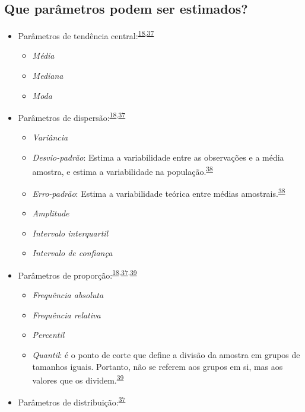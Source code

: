 \documentclass[
]{book}
\begin{document}
\hypertarget{que-paruxe2metros-podem-ser-estimados}{%
\subsection{Que parâmetros podem ser estimados?}\label{que-paruxe2metros-podem-ser-estimados}}

\begin{itemize}
\item
  Parâmetros de tendência central:\textsuperscript{\protect\hyperlink{ref-Ali2016}{18},\protect\hyperlink{ref-kanji2006}{37}}

  \begin{itemize}
  \item
    \emph{Média}
  \item
    \emph{Mediana}
  \item
    \emph{Moda}
  \end{itemize}
\item
  Parâmetros de dispersão:\textsuperscript{\protect\hyperlink{ref-Ali2016}{18},\protect\hyperlink{ref-kanji2006}{37}}

  \begin{itemize}
  \item
    \emph{Variância}
  \item
    \emph{Desvio-padrão}: Estima a variabilidade entre as observações e a média amostra, e estima a variabilidade na população.\textsuperscript{\protect\hyperlink{ref-Curran-Everett2008}{38}}
  \item
    \emph{Erro-padrão}: Estima a variabilidade teórica entre médias amostrais.\textsuperscript{\protect\hyperlink{ref-Curran-Everett2008}{38}}
  \item
    \emph{Amplitude}
  \item
    \emph{Intervalo interquartil}
  \item
    \emph{Intervalo de confiança}
  \end{itemize}
\item
  Parâmetros de proporção:\textsuperscript{\protect\hyperlink{ref-Ali2016}{18},\protect\hyperlink{ref-kanji2006}{37},\protect\hyperlink{ref-Altman1994}{39}}

  \begin{itemize}
  \item
    \emph{Frequência absoluta}
  \item
    \emph{Frequência relativa}
  \item
    \emph{Percentil}
  \item
    \emph{Quantil}: é o ponto de corte que define a divisão da amostra em grupos de tamanhos iguais. Portanto, não se referem aos grupos em si, mas aos valores que os dividem.\textsuperscript{\protect\hyperlink{ref-Altman1994}{39}}
  \end{itemize}
\item
  Parâmetros de distribuição:\textsuperscript{\protect\hyperlink{ref-kanji2006}{37}}


\end{itemize}
\end{document}
